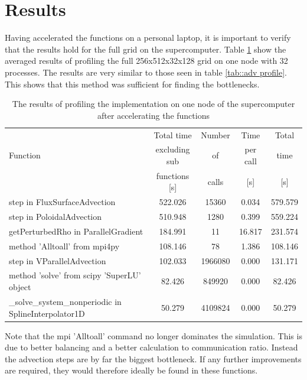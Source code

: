 \section{Results}

Having accelerated the functions on a personal laptop, it is important to verify that the results hold for the full grid on the supercomputer. Table \ref{tab::draco profile} show the averaged results of profiling the full 256x512x32x128 grid on one node with 32 processes. The results are very similar to those seen in table \ref{tab::adv profile}. This shows that this method was sufficient for finding the bottlenecks.

\begin{table}[ht]
\centering
 \begin{tabular}{|m{}|c|c|c|c|}
  \hline
          & Total time & Number & Time & Total \\
  Function & excluding sub & of & per call & time \\
          & functions [s] & calls & [s] & [s] \\
  \hline
  \hline
  step in FluxSurfaceAdvection & 522.026 & 15360 & 0.034 & 579.579 \\
  \hline
  step in PoloidalAdvection & 510.948 & 1280 & 0.399 & 559.224 \\
  \hline
  getPerturbedRho in ParallelGradient & 184.991 & 11 & 16.817 & 231.574 \\
  \hline
  method 'Alltoall' from mpi4py & 108.146 & 78 & 1.386 & 108.146 \\
  \hline
  step in VParallelAdvection & 102.033 & 1966080 & 0.000 & 131.171 \\
  \hline
  method 'solve' from scipy 'SuperLU' object & 82.426 & 849920 & 0.000 & 82.426 \\
  \hline
  \_solve\_system\_nonperiodic in SplineInterpolator1D & 50.279 & 4109824 & 0.000 & 50.279 \\
  \hline
 \end{tabular}
 \caption{\label{tab::draco profile} The results of profiling the implementation on one node of the supercomputer after accelerating the functions}
\end{table}

Note that the mpi 'Alltoall' command no longer dominates the simulation. This is due to better balancing and a better calculation to communication ratio. Instead the advection steps are by far the biggest bottleneck. If any further improvements are required, they would therefore ideally be found in these functions.

